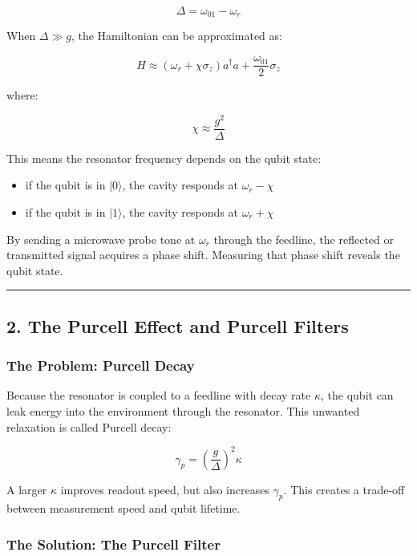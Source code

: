 \documentclass[
]{article}
\providecommand{\tightlist}{%
  \setlength{\itemsep}{0pt}\setlength{\parskip}{0pt}}
\begin{document}
\[
\Delta = \omega_{01} - \omega_r
\]

When \(\Delta \gg g\), the Hamiltonian can be approximated as:

\[
H \approx (\omega_r + \chi \sigma_z)a^\dagger a + \frac{\omega_{01}}{2}\sigma_z
\]

where:

\[
\chi \approx \frac{g^2}{\Delta}
\]

This means the resonator frequency depends on the qubit state:

\begin{itemize}
\tightlist
\item
  if the qubit is in \(|0\rangle\), the cavity responds at
  \(\omega_r - \chi\)
\item
  if the qubit is in \(|1\rangle\), the cavity responds at
  \(\omega_r + \chi\)
\end{itemize}

By sending a microwave probe tone at \(\omega_r\) through the feedline,
the reflected or transmitted signal acquires a phase shift. Measuring
that phase shift reveals the qubit state.

\begin{center}\rule{0.5\linewidth}{0.5pt}\end{center}

\subsection{2. The Purcell Effect and Purcell
Filters}\label{the-purcell-effect-and-purcell-filters}

\subsubsection{The Problem: Purcell
Decay}\label{the-problem-purcell-decay}

Because the resonator is coupled to a feedline with decay rate
\(\kappa\), the qubit can leak energy into the environment through the
resonator. This unwanted relaxation is called Purcell decay:

\[
\gamma_p = \left(\frac{g}{\Delta}\right)^2 \kappa
\]

A larger \(\kappa\) improves readout speed, but also increases
\(\gamma_p\). This creates a trade-off between measurement speed and
qubit lifetime.

\subsubsection{The Solution: The Purcell
Filter}\label{the-solution-the-purcell-filter}
\end{document}
